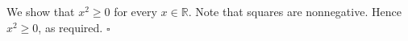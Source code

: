 We show that $x^{2} \geq 0$ for every $x \in \mathbb{R}$.
Note that squares are nonnegative.
Hence $x^{2} \geq 0$, as required. \hfill$\square$